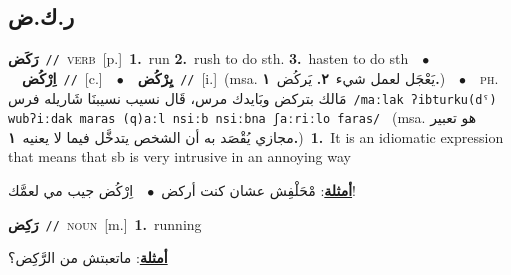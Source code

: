 \documentclass[10pt,a4paper,twoside]{article} %
\begin{document}
\begin{multicols}{2}
\vspace{-3mm}
\subsection*{\color{blue}\foreignlanguage{arabic}{ر.ك.ض}\color{blue}{}} 

{\setlength\topsep{0pt}\textbf{\foreignlanguage{arabic}{رَكَض}}\ {\color{gray}\texttt{//}\color{black}}\ \textsc{verb}\ [p.]\ \textbf{1.}~run  \textbf{2.}~rush to do sth.  \textbf{3.}~hasten to do sth\ \ $\bullet$\ \ \setlength\topsep{0pt}\textbf{\foreignlanguage{arabic}{اِرْكُض}}\ {\color{gray}\texttt{//}\color{black}}\ [c.]\ \ $\bullet$\ \ \setlength\topsep{0pt}\textbf{\foreignlanguage{arabic}{يِرْكُض}}\ {\color{gray}\texttt{//}\color{black}}\ [i.]\ \color{gray}(msa. \foreignlanguage{arabic}{يَعْجَل لعمل شيء}~\foreignlanguage{arabic}{\textbf{٢.}}  \foreignlanguage{arabic}{يَركُض}~\foreignlanguage{arabic}{\textbf{١.}})\color{black}\ \ $\bullet$\ \ \textsc{ph.} \color{gray} \foreignlanguage{arabic}{مَالك بتركض وبَايدك مرس، قَال نسيب نسيبنَا شَاريله فرس}\color{black}\ {\color{gray}\texttt{/{\sffamily maːlak ʔibturku(dˤ) wubʔiːdak maras (q)aːl nsiːb nsiːbna ʃaːriːlo faras}/}\color{black}}\ \color{gray} (msa. \foreignlanguage{arabic}{هو تعبير مجازي يُقْصَد به أن الشخص يتدخَّل فيما لا يعنيه}~\foreignlanguage{arabic}{\textbf{١.}})\color{black}\ \textbf{1.}~It is an idiomatic expression that means that sb is very intrusive in an annoying way\  \begin{flushright}\color{gray}\foreignlanguage{arabic}{\textbf{\underline{\foreignlanguage{arabic}{أمثلة}}}: مْحَلْفِش عشان كنت أركض\ $\bullet$\ \  اِرْكُض جيب مي لعمَّك!}\end{flushright}\color{black}} \vspace{2mm}

{\setlength\topsep{0pt}\textbf{\foreignlanguage{arabic}{رَكِض}}\ {\color{gray}\texttt{//}\color{black}}\ \textsc{noun}\ [m.]\ \textbf{1.}~running\  \begin{flushright}\color{gray}\foreignlanguage{arabic}{\textbf{\underline{\foreignlanguage{arabic}{أمثلة}}}: ماتعبتش من الرَّكِض؟}\end{flushright}\color{black}} \vspace{2mm}


\end{multicols}
\end{document}
